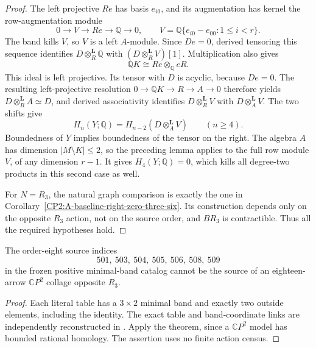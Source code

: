 \begin{proof}
The left projective $Re$ has basis $e_{i0}$, and its augmentation
has kernel the row-augmentation module
\[
 0\longrightarrow V\longrightarrow Re\longrightarrow\mathbb Q
 \longrightarrow0,
 \qquad V=\mathbb Q\{e_{i0}-e_{00}:1\le i<r\}.
\]
The band kills $V$, so $V$ is a left $A$-module.
Since $De=0$, derived tensoring this sequence identifies
$D\otimes_R^{\mathbf L}\mathbb Q$ with
$(D\otimes_R^{\mathbf L}V)[1]$.
Multiplication also gives
\[
 \mathbb QK\cong Re\otimes_{\mathbb Q}eR.
\]
This ideal is left projective.  Its tensor with $D$ is acyclic,
because $De=0$.  The resulting left-projective resolution
$0\to\mathbb QK\to R\to A\to0$ therefore yields
$D\otimes_R^{\mathbf L}A\simeq D$, and derived associativity
identifies $D\otimes_R^{\mathbf L}V$ with
$D\otimes_A^{\mathbf L}V$.
The two shifts give
\[
 H_n(Y;\mathbb Q)=H_{n-2}(D\otimes_A^{\mathbf L}V)
 \qquad(n\ge4).
\]
Boundedness of $Y$ implies boundedness of the tensor on the right.
The algebra $A$ has dimension $|M\setminus K|\le2$, so the preceding
lemma applies to the full row module $V$, of any dimension $r-1$.
It gives $H_4(Y;\mathbb Q)=0$, which kills all degree-two products
in this second case as well.

For $N=R_3$, the natural graph comparison is exactly the one in
Corollary~\ref{CP2:A-baseline-right-zero-three-six}.  Its construction
depends only on the opposite $R_3$ action, not on the source order,
and $BR_3$ is contractible.  Thus all the required hypotheses hold.
\end{proof}

\begin{corollary}
\label{CP2:A-eight-three-row-two-column-sources}
The order-eight source indices
\[
 501,\ 503,\ 504,\ 505,\ 506,\ 508,\ 509
\]
in the frozen positive minimal-band catalog cannot be the source of
an eighteen-arrow $\mathbb CP^2$ collage opposite $R_3$.
\end{corollary}
\begin{proof}
Each literal table has a $3\times2$ minimal band and exactly two
outside elements, including the identity.  The exact table and
band-coordinate links are independently reconstructed in
.
Apply the theorem, since a $\mathbb CP^2$ model has bounded
rational homology.  The assertion uses no finite action census.
\end{proof}
